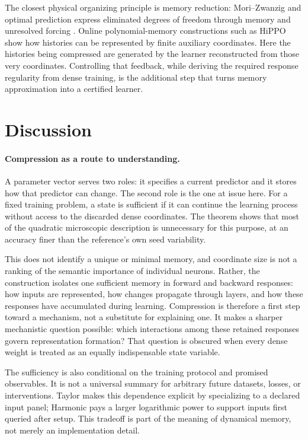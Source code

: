 \documentclass[11pt]{article}
\theoremstyle{definition}
\theoremstyle{remark}
\begin{document}
The closest physical organizing principle is memory reduction:
Mori--Zwanzig and optimal prediction express eliminated degrees of freedom
through memory and unresolved forcing \cite{chorin2000optimal}.
Online polynomial-memory constructions such as HiPPO
\cite{gu2020hippo} show how histories can be represented by finite auxiliary
coordinates. Here the histories being compressed are generated by the
learner reconstructed from those very coordinates. Controlling that
feedback, while deriving the required response regularity from dense
training, is the additional step that turns memory approximation into
a certified learner.

\section{Discussion}
\label{cp:discussion}

\paragraph{Compression as a route to understanding.}
A parameter vector serves two roles: it specifies a current predictor and
it stores how that predictor can change. The second role is the one at
issue here. For a fixed training problem, a state is sufficient if it can
continue the learning process without access to the discarded dense
coordinates. The theorem shows that most of the quadratic microscopic
description is unnecessary for this purpose, at an accuracy finer than
the reference's own seed variability.

This does not identify a unique or minimal memory, and coordinate size is
not a ranking of the semantic importance of individual neurons. Rather,
the construction isolates one sufficient memory in forward and backward
responses: how inputs are represented, how changes propagate through
layers, and how these responses have accumulated during learning.
Compression is therefore a first step toward a mechanism, not a substitute
for explaining one. It makes a sharper mechanistic question possible:
which interactions among these retained responses govern representation
formation? That question is obscured when every dense weight is treated
as an equally indispensable state variable.

The sufficiency is also conditional on the training protocol and promised
observables. It is not a universal summary for arbitrary future datasets,
losses, or interventions. Taylor makes this dependence explicit by
specializing to a declared input panel; Harmonic pays a larger logarithmic
power to support inputs first queried after setup. This tradeoff is part of
the meaning of dynamical memory, not merely an implementation detail.
\end{document}
